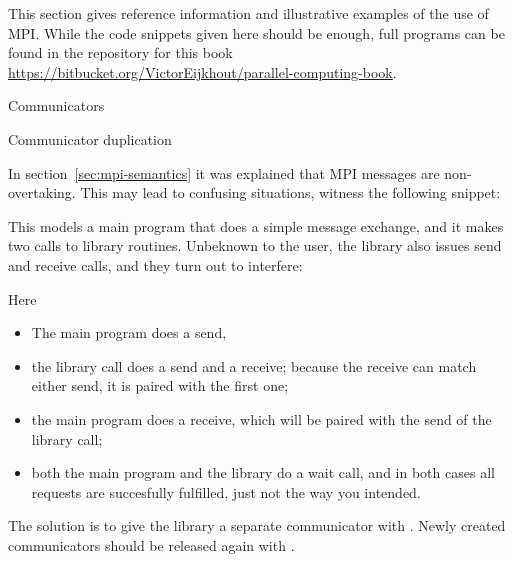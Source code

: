 
This section gives reference information and illustrative examples
of the use of MPI. While the code snippets given here should be enough,
full programs can be found in the repository for this book
\url{https://bitbucket.org/VictorEijkhout/parallel-computing-book}.

 {Communicators}

 {Communicator duplication}
\label{sec:ref:comm-dup}

In section~\ref{sec:mpi-semantics} it was explained that MPI messages are 
non-overtaking. This may lead to confusing situations, witness the following snippet:


This models a main program that does a simple message exchange, and it
makes two calls to library routines. Unbeknown to the user, the
library also issues send and receive calls, and they turn out to
interfere:


Here
\begin{itemize}
\item The main program does a send,
\item the library call  does a send and a receive;
  because the receive can match either send, it is paired with the
  first one;
\item the main program does a receive, which will be paired with the send of the 
  library call;
\item both the main program and the library do a wait call, and in
  both cases all requests are succesfully fulfilled, just not the way
  you intended.
\end{itemize}

The solution is to give the library a separate communicator with
.
%
%
Newly created communicators should be
released again with .



